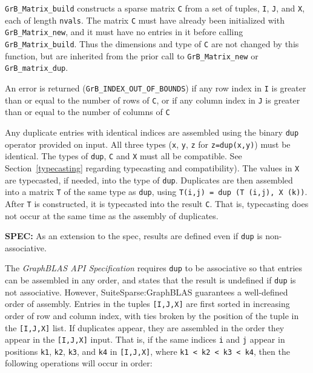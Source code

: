 \documentclass[12pt]{article}
\begin{document}
\verb'GrB_Matrix_build' constructs a sparse matrix \verb'C' from a set of
tuples, \verb'I', \verb'J', and \verb'X', each of length \verb'nvals'.  The
matrix \verb'C' must have already been initialized with \verb'GrB_Matrix_new',
and it must have no entries in it before calling \verb'GrB_Matrix_build'.  Thus
the dimensions and type of \verb'C' are not changed by this function, but are
inherited from the prior call to \verb'GrB_Matrix_new' or
\verb'GrB_matrix_dup'.

An error is returned (\verb'GrB_INDEX_OUT_OF_BOUNDS') if any row index in
\verb'I' is greater than or equal to the number of rows of \verb'C', or if any
column index in \verb'J' is greater than or equal to the number of columns of
\verb'C'

Any duplicate entries with identical indices are assembled using the binary
\verb'dup' operator provided on input.  All three types (\verb'x', \verb'y',
\verb'z' for \verb'z=dup(x,y)') must be identical.  The types of \verb'dup',
\verb'C' and \verb'X' must all be compatible.  See Section~\ref{typecasting}
regarding typecasting and compatibility).  The values in \verb'X' are
typecasted, if needed, into the type of \verb'dup'.  Duplicates are then
assembled into a matrix \verb'T' of the same type as \verb'dup', using
\verb'T(i,j) = dup (T (i,j), X (k))'.  After \verb'T' is constructed, it is
typecasted into the result \verb'C'.  That is, typecasting does not occur at
the same time as the assembly of duplicates.

\begin{spec}
{\bf SPEC:} As an extension to the spec, results are defined even if \verb'dup' is non-associative.
\end{spec}

The {\em GraphBLAS API Specification} requires \verb'dup' to be associative so
that entries can be assembled in any order, and states that the result is
undefined if \verb'dup' is not associative.  However, SuiteSparse:GraphBLAS
guarantees a well-defined order of assembly.  Entries in the tuples
\verb'[I,J,X]' are first sorted in increasing order of row and column index,
with ties broken by the position of the tuple in the \verb'[I,J,X]' list.  If
duplicates appear, they are assembled in the order they appear in the
\verb'[I,J,X]' input.  That is, if the same indices \verb'i' and \verb'j'
appear in positions \verb'k1', \verb'k2', \verb'k3', and \verb'k4' in
\verb'[I,J,X]', where \verb'k1 < k2 < k3 < k4', then the following operations
will occur in order:
\end{document}
